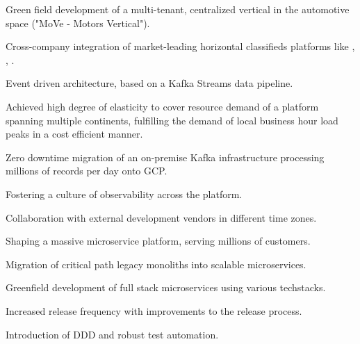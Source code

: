 \documentclass[]{resume}
\begin{document}
\begin{minipage}[t]{0.64\textwidth}
\vspace{\topsep} %
\begin{tightemize}
\item Green field development of a multi-tenant, centralized vertical in the automotive space ("MoVe - Motors Vertical").
\item Cross-company integration of market-leading horizontal classifieds platforms like \href{https://www.kijiji.ca}{}, \href{https://www.gumtree.com.au}{}, \href{https://www.gumtree.co.uk}{}.
\item Event driven architecture, based on a Kafka Streams data pipeline.
\item Achieved high degree of elasticity to cover resource demand of a platform spanning multiple continents, fulfilling the demand of local business hour load peaks in a cost efficient manner.
\item Zero downtime migration of an on-premise Kafka infrastructure processing millions of records per day onto GCP.
\item Fostering a culture of observability across the platform.
\item Collaboration with external development vendors in different time zones.
\end{tightemize}
\sectionsep

\begin{tightemize}
\item Shaping a massive microservice platform, serving millions of customers.
\item Migration of critical path legacy monoliths into scalable microservices.
\item Greenfield development of full stack microservices using various techstacks.
\item Increased release frequency with improvements to the release process.
\item Introduction of DDD and robust test automation.
\end{tightemize}
\sectionsep

\sectionsep


\end{minipage}
\end{document}
